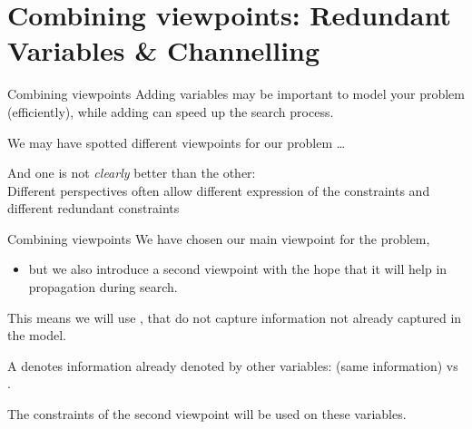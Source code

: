 \documentclass{cons-beamer}
\begin{document}
\section{Combining viewpoints: Redundant Variables \& Channelling}

\begin{frame}{Combining viewpoints}
  Adding  variables may be important to model your problem (efficiently), while adding  can speed up the search process.
  \vfill

  \vfill

  We may have spotted different viewpoints for our problem \dots
  \vfill

  And one is not \textit{clearly}  better than the other: \\
  Different perspectives often allow different expression of the constraints and different redundant constraints
  \vfill

\end{frame}

\begin{frame}{Combining viewpoints}
  We have chosen our main viewpoint for the problem,\\
  \begin{itemize}
    \item but we also introduce a second viewpoint with the hope that it will help in propagation during search.
  \end{itemize}
  \vfill

  This means we will use , that do not capture information not already captured in the model.
  \begin{definition}
    A  denotes information already denoted by other
    variables:  (same information) vs .
  \end{definition}\vfill

  The constraints of the second viewpoint will be used on these variables.
\end{frame}
\end{document}
